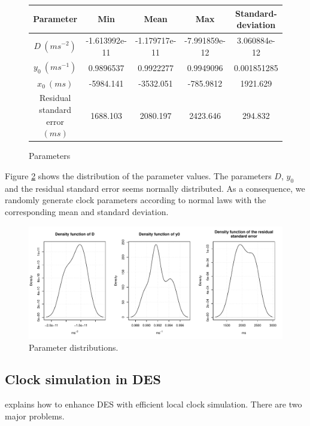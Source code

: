 \documentclass[11pt]{article}
\begin{document}
\begin{figure}[h!]
\scriptsize
\begin{center}
\begin{tabular}{|c|c|c|c|c|} 
\hline
Parameter & Min & Mean & Max & Standard-deviation \\
\hline
$D\ (ms^{-2})$ & -1.613992e-11 & -1.179717e-11 & -7.991859e-12 & 3.060884e-12 \\
\hline
$y_0\ (ms^{-1})$ & 0.9896537 & 0.9922277 & 0.9949096 & 0.001851285\\
\hline
$x_0\ (ms)$ & -5984.141 & -3532.051 & -785.9812 & 1921.629\\
\hline
Residual standard error $(ms)$ & 1688.103 &  2080.197  & 2423.646 & 294.832\\
\hline
\end{tabular}
\end{center}
\label{fig:parameter-values}
\caption{Parameters}
\end{figure}

Figure \ref{fig:parameter-distribution} shows the distribution of the parameter values. The parameters $D$, $y_0$ and the residual standard error seems normally distributed. As a consequence, we randomly generate clock parameters according to normal laws with the corresponding mean and standard deviation.

\begin{figure}[h!]
\centering
\includegraphics[width=\textwidth]{pictures/parameters.pdf}
\caption{Parameter distributions.}
\label{fig:parameter-distribution}
\end{figure}

\newpage

\subsection{Clock simulation in DES}

\cite{ring2010clock} explains how to enhance DES with efficient local clock simulation. There are two major problems.
\end{document}
